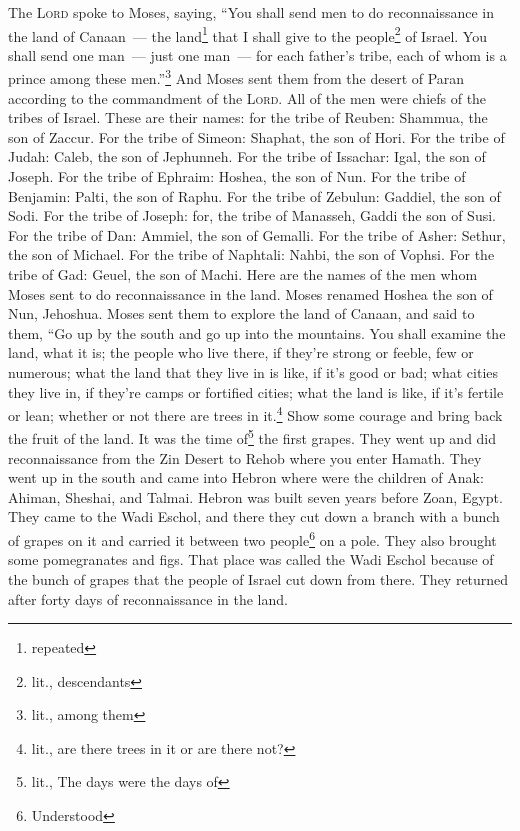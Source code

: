 
\begin{enumerate*}[mode=unboxed]
     The \textsc{Lord} spoke to Moses, saying,%
     ``You shall send men to do reconnaissance in the land of Canaan~--- the land\footnote{repeated} that I shall give to the people\footnote{lit., descendants} of Israel. You shall send one man~--- just one man~--- for each father's tribe, each of whom is a prince among these men.''\footnote{lit., among them}%
     And Moses sent them from the desert of Paran according to the commandment of the \textsc{Lord}. All of the men were chiefs of the tribes of Israel.%
     These are their names: for the tribe of Reuben: Shammua, the son of Zaccur.%
     For the tribe of Simeon: Shaphat, the son of Hori.%
     For the tribe of Judah: Caleb, the son of Jephunneh.%
     For the tribe of Issachar: Igal, the son of Joseph.%
     For the tribe of Ephraim: Hoshea, the son of Nun.%
     For the tribe of Benjamin: Palti, the son of Raphu.%
     For the tribe of Zebulun: Gaddiel, the son of Sodi.%
     For the tribe of Joseph: for, the tribe of Manasseh, Gaddi the son of Susi.%
     For the tribe of Dan: Ammiel, the son of Gemalli.%
     For the tribe of Asher: Sethur, the son of Michael.%
     For the tribe of Naphtali: Nahbi, the son of Vophsi.%
     For the tribe of Gad: Geuel, the son of Machi.%
     Here are the names of the men whom Moses sent to do reconnaissance in the land. Moses renamed Hoshea the son of Nun, Jehoshua.%
     Moses sent them to explore the land of Canaan, and said to them, ``Go up by the south and go up into the mountains.%
     You shall examine the land, what it is; the people who live there, if they're strong or feeble, few or numerous;%
     what the land that they live in is like, if it's good or bad; what cities they live in, if they're camps or fortified cities;%
     what the land is like, if it's fertile or lean; whether or not there are trees in it.\footnote{lit., are there trees in it or are there not?} Show some courage and bring back the fruit of the land. It was the time of\footnote{lit., The days were the days of} the first grapes.%
     They went up and did reconnaissance from the Zin Desert to Rehob where you enter Hamath.%
     They went up in the south and came into Hebron where were the children of Anak: Ahiman, Sheshai, and Talmai. Hebron was built seven years before Zoan, Egypt.%
     They came to the Wadi Eschol, and there they cut down a branch with a bunch of grapes on it and carried it between two people\footnote{Understood} on a pole. They also brought some pomegranates and figs.%
     That place was called the Wadi Eschol because of the bunch of grapes that the people of Israel cut down from there.%
     They returned after forty days of reconnaissance in the land.%
\end{enumerate*}
